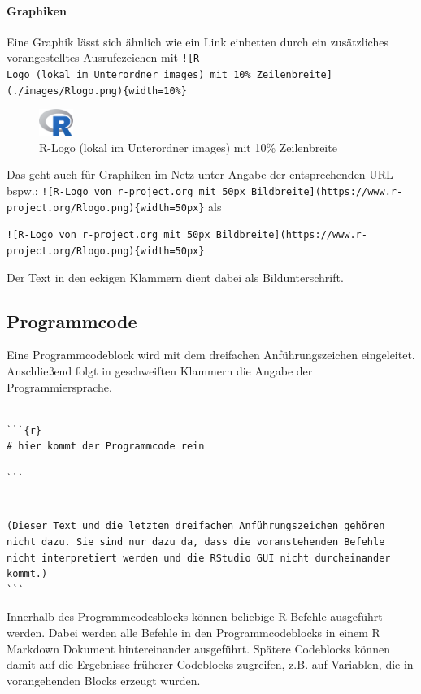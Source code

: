\documentclass[
]{article}
\begin{document}
\hypertarget{graphiken}{%
\paragraph{Graphiken}\label{graphiken}}

Eine Graphik lässt sich ähnlich wie ein Link einbetten durch ein
zusätzliches vorangestelltes Ausrufezeichen mit
\texttt{!{[}R-Logo\ (lokal\ im\ Unterordner\ images)\ mit\ 10\%\ Zeilenbreite{]}(./images/Rlogo.png)\{width=10\%\}}

\begin{figure}
\centering
\includegraphics[width=0.1\textwidth,height=\textheight]{./images/Rlogo.png}
\caption{R-Logo (lokal im Unterordner images) mit 10\% Zeilenbreite}
\end{figure}

Das geht auch für Graphiken im Netz unter Angabe der entsprechenden URL
bspw.:
\texttt{!{[}R-Logo\ von\ r-project.org\ mit\ 50px\ Bildbreite{]}(https://www.r-project.org/Rlogo.png)\{width=50px\}}
als

\texttt{!{[}R-Logo\ von\ r-project.org\ mit\ 50px\ Bildbreite{]}(https://www.r-project.org/Rlogo.png)\{width=50px\}}

Der Text in den eckigen Klammern dient dabei als Bildunterschrift.

\hypertarget{programmcode}{%
\subsection{Programmcode}\label{programmcode}}

Eine Programmcodeblock wird mit dem dreifachen Anführungszeichen
eingeleitet. Anschließend folgt in geschweiften Klammern die Angabe der
Programmiersprache.

\begin{verbatim}

```{r}
# hier kommt der Programmcode rein

``` 


(Dieser Text und die letzten dreifachen Anführungszeichen gehören nicht dazu. Sie sind nur dazu da, dass die voranstehenden Befehle nicht interpretiert werden und die RStudio GUI nicht durcheinander kommt.)
```
\end{verbatim}

Innerhalb des Programmcodesblocks können beliebige R-Befehle ausgeführt
werden. Dabei werden alle Befehle in den Programmcodeblocks in einem R
Markdown Dokument hintereinander ausgeführt. Spätere Codeblocks können
damit auf die Ergebnisse früherer Codeblocks zugreifen, z.B. auf
Variablen, die in vorangehenden Blocks erzeugt wurden.
\end{document}
